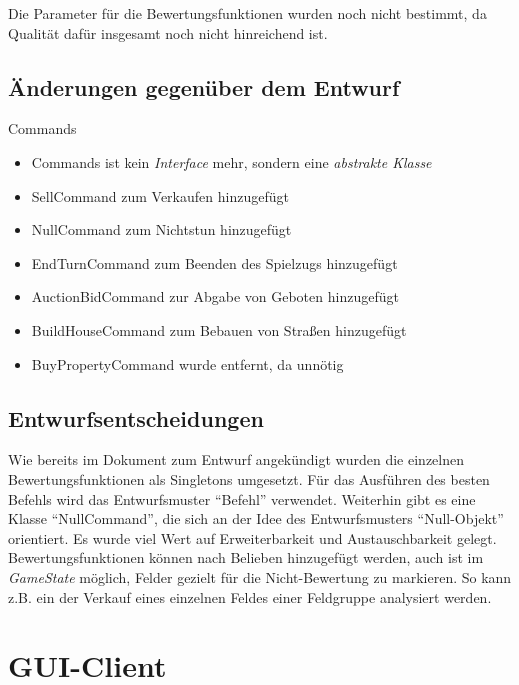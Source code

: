\documentclass[a4paper,10pt]{article}
\begin{document}
Die Parameter für die Bewertungsfunktionen wurden noch nicht bestimmt, da Qualität dafür insgesamt noch nicht hinreichend ist.
\subsection{Änderungen gegenüber dem Entwurf}
Commands
\begin{itemize}
\item Commands ist kein \textit{Interface} mehr, sondern eine \textit{abstrakte Klasse}
\item SellCommand zum Verkaufen hinzugefügt
\item NullCommand zum Nichtstun hinzugefügt
\item EndTurnCommand zum Beenden des Spielzugs hinzugefügt
\item AuctionBidCommand zur Abgabe von Geboten hinzugefügt
\item BuildHouseCommand zum Bebauen von Straßen hinzugefügt
\item BuyPropertyCommand wurde entfernt, da unnötig
\end{itemize}
\subsection{Entwurfsentscheidungen}
Wie bereits im Dokument zum Entwurf angekündigt wurden die einzelnen Bewertungsfunktionen als Singletons umgesetzt. Für das Ausführen des besten Befehls wird das Entwurfsmuster ``Befehl'' verwendet. Weiterhin gibt es eine Klasse ``NullCommand'', die sich an der Idee des Entwurfsmusters ``Null-Objekt'' orientiert.
Es wurde viel Wert auf Erweiterbarkeit und Austauschbarkeit gelegt. Bewertungsfunktionen können nach Belieben hinzugefügt werden, auch ist im \textit{GameState} möglich, Felder gezielt für die Nicht-Bewertung zu markieren. So kann z.B. ein der Verkauf eines einzelnen Feldes einer Feldgruppe analysiert werden.
\newpage
\section{GUI-Client}
\end{document}
